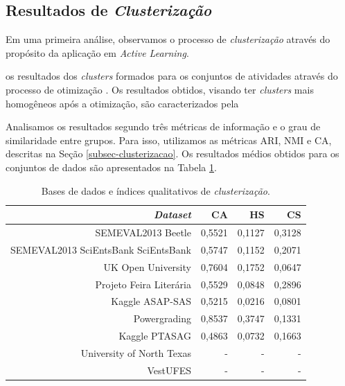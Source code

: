 \subsection{Resultados de \textit{Clusterização}}
\label{sec-res-clustering}

Em uma primeira análise, observamos o processo de \textit{clusterização} através do propósito da aplicação em \textit{Active Learning}. 



os resultados dos \textit{clusters} formados para os conjuntos de atividades através do processo de otimização \cite{spalenza2019}. Os resultados obtidos, visando ter \textit{clusters} mais homogêneos após a otimização, são caracterizados pela 



Analisamos os resultados segundo três métricas de informação e o grau de similaridade entre grupos. Para isso, utilizamos as métricas ARI, NMI e CA, descritas na Seção \ref{subsec-clusterizacao}. Os resultados médios obtidos para os conjuntos de dados são apresentados na Tabela \ref{tab-clstr-index}.

\begin{table}[!h]
\begin{center}
\begin{tabular}{r | r r r }
 \hline

\textit{Dataset}  & CA & HS & CS \\ \hline 
SEMEVAL2013 Beetle & 0,5521 & 0,1127 & 0,3128 \\
SEMEVAL2013 SciEntsBank SciEntsBank & 0,5747 & 0,1152 & 0,2071 \\
UK Open University  & 0,7604 & 0,1752 & 0,0647 \\
Projeto Feira Liter{\'a}ria & 0,5529 & 0,0848 & 0,2896 \\
Kaggle ASAP-SAS   & 0,5215 & 0,0216 & 0,0801 \\
Powergrading & 0,8537 & 0,3747 & 0,1331 \\
Kaggle PTASAG  & 0,4863 & 0,0732 & 0,1663 \\
University of North Texas & - & - & - \\
VestUFES & - & - & - \\
 \hline
\end{tabular}
\end{center}
\caption{Bases de dados e índices qualitativos de \textit{clusterização}.}
\label{tab-clstr-index}
\end{table}

